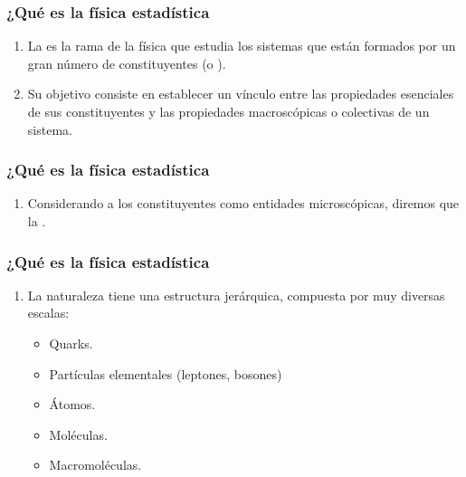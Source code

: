 \documentclass[12pt]{beamer}
\begin{document}
\begin{frame}
\frametitle{¿Qué es la física estadística}
\begin{enumerate}[<+->]
\item La  es la rama de la física que estudia los sistemas que están formados por un gran número de constituyentes (o ).
\item Su objetivo consiste en establecer un vínculo entre las propiedades esenciales de sus constituyentes y las propiedades macroscópicas o colectivas de un sistema.
\seti
\end{enumerate}
\end{frame}
\begin{frame}
\frametitle{¿Qué es la física estadística}
\begin{enumerate}[<+->]
\conti
\item Considerando a los constituyentes como entidades microscópicas, diremos que la  \pause {}.
\seti
\end{enumerate}
\end{frame}
\begin{frame}
\frametitle{¿Qué es la física estadística}
\begin{enumerate}[<+->]
\conti
\item La naturaleza tiene una estructura jerárquica, compuesta por muy diversas escalas:
\begin{itemize}[<+->]
\item Quarks.
\item Partículas elementales (leptones, bosones)
\item Átomos.
\item Moléculas.
\item Macromoléculas.
\end{itemize}
\conti
\end{enumerate}
\end{frame}
\end{document}

